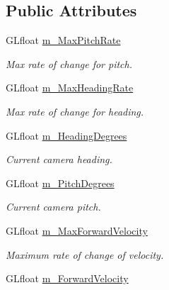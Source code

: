 \subsection*{Public Attributes}
\begin{DoxyCompactItemize}
\item 
\hypertarget{classgl_camera_acdf55308d9979c5ba9d8089667ac30d6}{
GLfloat \hyperlink{classgl_camera_acdf55308d9979c5ba9d8089667ac30d6}{m\_\-MaxPitchRate}}
\label{classgl_camera_acdf55308d9979c5ba9d8089667ac30d6}

\begin{DoxyCompactList}\small\item\em Max rate of change for pitch. \end{DoxyCompactList}\item 
\hypertarget{classgl_camera_abfd5f2c24a7a39611d26ff8f999a6085}{
GLfloat \hyperlink{classgl_camera_abfd5f2c24a7a39611d26ff8f999a6085}{m\_\-MaxHeadingRate}}
\label{classgl_camera_abfd5f2c24a7a39611d26ff8f999a6085}

\begin{DoxyCompactList}\small\item\em Max rate of change for heading. \end{DoxyCompactList}\item 
\hypertarget{classgl_camera_a24938ca39d5e9bb8b96daa699f737b84}{
GLfloat \hyperlink{classgl_camera_a24938ca39d5e9bb8b96daa699f737b84}{m\_\-HeadingDegrees}}
\label{classgl_camera_a24938ca39d5e9bb8b96daa699f737b84}

\begin{DoxyCompactList}\small\item\em Current camera heading. \end{DoxyCompactList}\item 
\hypertarget{classgl_camera_ad739e692207e3f47875c13fe3631179e}{
GLfloat \hyperlink{classgl_camera_ad739e692207e3f47875c13fe3631179e}{m\_\-PitchDegrees}}
\label{classgl_camera_ad739e692207e3f47875c13fe3631179e}

\begin{DoxyCompactList}\small\item\em Current camera pitch. \end{DoxyCompactList}\item 
\hypertarget{classgl_camera_a04cd8c661f77229cca31498e188df357}{
GLfloat \hyperlink{classgl_camera_a04cd8c661f77229cca31498e188df357}{m\_\-MaxForwardVelocity}}
\label{classgl_camera_a04cd8c661f77229cca31498e188df357}

\begin{DoxyCompactList}\small\item\em Maximum rate of change of velocity. \end{DoxyCompactList}\item 
\hypertarget{classgl_camera_ad008d68e6efa17fc0d42b448b0c0772a}{
GLfloat \hyperlink{classgl_camera_ad008d68e6efa17fc0d42b448b0c0772a}{m\_\-ForwardVelocity}}
\label{classgl_camera_ad008d68e6efa17fc0d42b448b0c0772a}


\end{DoxyCompactItemize}
